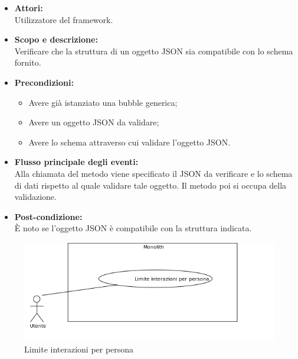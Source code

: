 \begin{itemize}
	\item \textbf{Attori:}
	\\Utilizzatore del framework.
	\item \textbf{Scopo e descrizione:} 
	\\Verificare che la struttura di un oggetto JSON sia compatibile con lo schema fornito.
	\item \textbf{Precondizioni:}
	\begin{itemize}
		\item Avere già istanziato una bubble generica;
		\item Avere un oggetto JSON da validare;
		\item Avere lo schema attraverso cui validare l'oggetto JSON.
	\end{itemize}
	\item \textbf{Flusso principale degli eventi:}
	\\Alla chiamata del metodo viene specificato il JSON da verificare e lo schema di dati rispetto al quale validare tale oggetto. Il metodo poi si occupa della validazione.
	\item \textbf{Post-condizione:}
	\\È noto se l'oggetto JSON è compatibile con la struttura indicata.
\end{itemize}


\begin{figure}[H]
	\centering
	\includegraphics[width=15cm]{../../documenti/AnalisiDeiRequisiti/Diagrammi_img/uc1_08.png}
	\caption{\UCCaption{} Limite interazioni per persona}
\end{figure}

